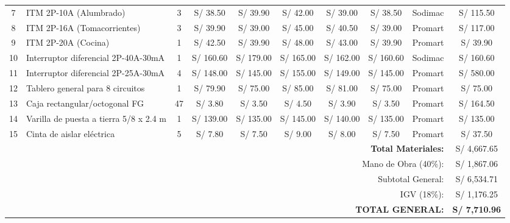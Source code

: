 \documentclass[11pt,a4paper]{article}
\begin{document}
\begin{landscape}
\begin{table}[H]
\begin{scriptsize}
\begin{tabularx}{1.30\textwidth}{c X c c c c c c c c}
					7 & ITM 2P-10A (Alumbrado) & 3 &
					S/ 38.50 & S/ 39.90 & S/ 42.00 & S/ 39.00 &
					S/ 38.50 & Sodimac & S/ 115.50 \\

					8 & ITM 2P-16A (Tomacorrientes) & 3 &
					S/ 39.90 & S/ 39.00 & S/ 45.00 & S/ 40.50 &
					S/ 39.00 & Promart & S/ 117.00 \\

					9 & ITM 2P-20A (Cocina) & 1 &
					S/ 42.50 & S/ 39.90 & S/ 48.00 & S/ 43.00 &
					S/ 39.90 & Promart & S/ 39.90 \\

					10 & Interruptor diferencial 2P-40A-30mA & 1 &
					S/ 160.60 & S/ 179.00 & S/ 165.00 & S/ 162.00 &
					S/ 160.60 & Sodimac & S/ 160.60 \\

					11 & Interruptor diferencial 2P-25A-30mA & 4 &
					S/ 148.00 & S/ 145.00 & S/ 155.00 & S/ 149.00 &
					S/ 145.00 & Promart & S/ 580.00 \\

					12 & Tablero general para 8 circuitos & 1 &
					S/ 79.90 & S/ 75.00 & S/ 85.00 & S/ 81.00 &
					S/ 75.00 & Promart & S/ 75.00 \\

					13 & Caja rectangular/octogonal FG & 47 &
					S/ 3.80 & S/ 3.50 & S/ 4.50 & S/ 3.90 &
					S/ 3.50 & Promart & S/ 164.50 \\

					14 & Varilla de puesta a tierra 5/8 x 2.4 m & 1 &
					S/ 139.00 & S/ 135.00 & S/ 145.00 & S/ 140.00 &
					S/ 135.00 & Promart & S/ 135.00 \\

					15 & Cinta de aislar eléctrica & 5 &
					S/ 7.80 & S/ 7.50 & S/ 9.00 & S/ 8.00 &
					S/ 7.50 & Promart & S/ 37.50 \\

					\midrule

					\multicolumn{9}{r}{\textbf{Total Materiales:}} & S/ 4,667.65 \\
					\multicolumn{9}{r}{Mano de Obra (40\%):} & S/ 1,867.06 \\
					\multicolumn{9}{r}{Subtotal General:} & S/ 6,534.71 \\
					\multicolumn{9}{r}{IGV (18\%):} & S/ 1,176.25 \\
					\multicolumn{9}{r}{\textbf{TOTAL GENERAL:}} & \textbf{S/ 7,710.96} \\

					\bottomrule
				\end{tabularx}

			\end{scriptsize}
		\end{table}

	\end{landscape}
\end{document}
